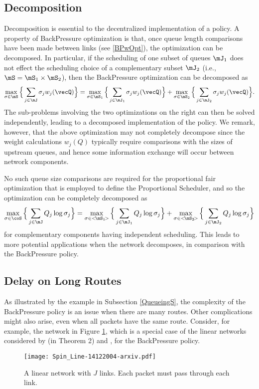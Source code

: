 \documentclass{amsart}
\begin{document}
\subsection{Decomposition}
Decomposition is essential to the decentralized implementation of a policy. 
A property of BackPressure optimization is that, once queue length comparisons have been made between links (see \eqref{BPwOpt}), the optimization can be decomposed. In particular, if the scheduling of one subset of queues $\mJ_1$ does not effect the scheduling choice of a complementary subset $\mJ_2$ (i.e., $\mS=\mS_1\times\mS_2$), then the BackPressure optimization can be decomposed as 
\begin{equation*}
\max_{\sigma\in\mS} \Big\{ \sum_{j \in \mJ} \sigma_j w_j(\vecQ) \Big\}= \max_{\sigma\in\mS_1} \Big\{  \sum_{j \in \mJ_1} \sigma_j w_j(\vecQ) \Big\} + \max_{\sigma\in\mS_2} \Big\{  \sum_{j \in \mJ_2} \sigma_j w_j(\vecQ) \Big\}.
\end{equation*}
The sub-problems involving the two optimizations on the right can then be solved independently, leading to a decomposed implementation of the policy. We remark, however, that the above optimization may not completely decompose since the weight calculations $w_j(Q)$ typically require comparisons with the sizes of upstream queues, and hence some information exchange will occur between network components. 

No such queue size comparisons are required for the proportional fair optimization that is employed to define the Proportional Scheduler, and so the optimization can be completely decomposed as
\begin{equation*}
\max_{\sigma\in\coS} \Big\{  \sum_{j \in \mJ} Q_j \log \sigma_j \Big\}=  \max_{\sigma\in <\! \mS_1\!>}\Big\{ \sum_{j \in \mJ_1} Q_j \log \sigma_j \Big\} + \max_{\sigma\in <\! \mS_2\!>} \Big\{  \sum_{j \in \mJ_2} Q_j \log \sigma_j \Big\}
\end{equation*}
for complementary components having 
independent scheduling.
This leads to more potential applications when the network decomposes, in comparison with the BackPressure policy.

\subsection{Delay on Long Routes}\label{delay}
As illustrated by the example in Subsection \ref{QueueingS},
the complexity of the BackPressure policy is an issue when there are many routes.  Other complications might also arise, even when all packets have the same route.
Consider, for example, the network in Figure \ref{Line}, which
is a special case  of the linear networks considered by \cite{BSS11} (in Theorem 2) and \cite{St11}, for the BackPressure policy. 
\begin{figure}[h!]
  \centering
\texttt{[image: Spin\_Line-14122004-arxiv.pdf]}
\caption{A linear network with $J$ links. Each packet must pass through each link.
\label{Line} }
\end{figure}
\end{document}
